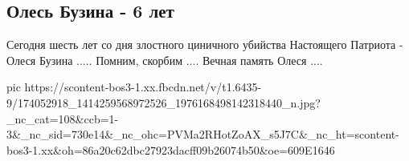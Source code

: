  
 
 
 
 

\subsection{Олесь Бузина - 6 лет}

Сегодня шесть лет со дня злостного циничного убийства Настоящего Патриота  -
Олеся Бузина ..... Помним, скорбим .... Вечная память Олеся ....

\ifcmt
  pic https://scontent-bos3-1.xx.fbcdn.net/v/t1.6435-9/174052918_1414259568972526_1976168498142318440_n.jpg?_nc_cat=108&ccb=1-3&_nc_sid=730e14&_nc_ohc=PVMa2RHotZoAX_s5J7C&_nc_ht=scontent-bos3-1.xx&oh=86a20c62dbc27923dacff09b26074b50&oe=609E1646
\fi

